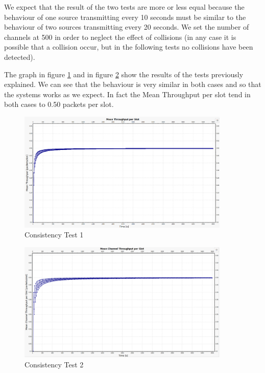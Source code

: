 \noindent We expect that the result of the two tests are more or less equal because the behaviour of one source transmitting every 10 seconds must be similar to the behaviour of two sources transmitting every 20 seconds. We set the number of channels at 500 in order to neglect the effect of collisions (in any case it is possible that a collision occur, but in the following tests no collisions have been detected).

\noindent The graph in figure \ref{img: consistencyTest1a} and in figure \ref{img: consistencyTest1b} show the results of the tests previously explained. We can see that the behaviour is very similar in both cases and so that the systems works as we expect. In fact the Mean Throughput per slot tend in both cases to 0.50 packets per slot.

\begin{figure}[H]
	\centering
	\includegraphics[width=0.9\textwidth]{img/consistencyTest1aWithAxis.png}
	\caption{Consistency Test 1}
	\label {img: consistencyTest1a}
\end{figure}

\begin{figure}[H]
	\centering
	\includegraphics[width=0.9\textwidth]{img/consistencyTest1bWithAxis.png}
	\caption{Consistency Test 2}
	\label {img: consistencyTest1b}
\end{figure}

